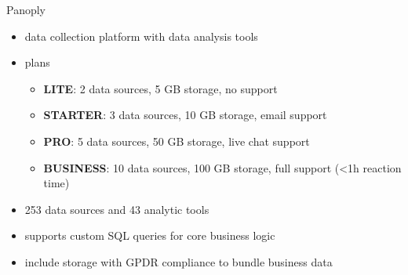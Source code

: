 \documentclass[aspectratio=169]{beamer}
\begin{document}
  \begin{frame}{Panoply}
    \begin{itemize}
      \item data collection platform with data analysis tools
      \item plans
      \begin{itemize}
        \item \textbf{LITE}: 2 data sources, 5 GB storage, no support
        \item \textbf{STARTER}: 3 data sources, 10 GB storage, email support
        \item \textbf{PRO}: 5 data sources, 50 GB storage, live chat support
        \item \textbf{BUSINESS}: 10 data sources, 100 GB storage, full support (<1h reaction time)
      \end{itemize}
      \item 253 data sources and 43 analytic tools
      \item supports custom SQL queries for core business logic
      \item include storage with GPDR compliance to bundle business data
    \end{itemize}
  \end{frame}
\end{document}
